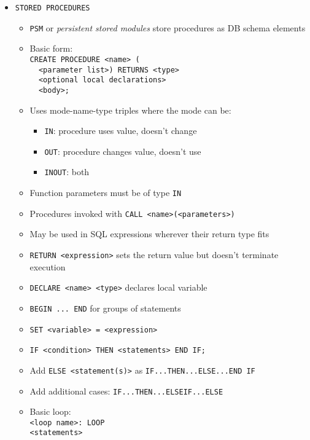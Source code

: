 \documentclass[landscape,8pt]{extarticle}
\newcommand{\code}{\lstinline}
\begin{document}
\begin{multicols}{4}
\begin{itemize}
\begin{itemize}
\begin{itemize}
        \end{itemize}
    \end{itemize}
    \item \code{STORED PROCEDURES}
    \begin{itemize}
        \item \code{PSM} or \emph{persistent stored modules} store procedures as DB schema elements
        \item Basic form:\\
\code{CREATE PROCEDURE <name> (}\\
\code{  <parameter list>) RETURNS <type>}\\
\code{  <optional local declarations>}\\
\code{  <body>;}
        \item Uses mode-name-type triples where the mode can be:
        \begin{itemize}
            \item \code{IN}: procedure uses value, doesn't change 
            \item \code{OUT}: procedure changes value, doesn't use
            \item \code{INOUT}: both
        \end{itemize}
        \item Function parameters must be of type \code{IN}
        \item Procedures invoked with \code{CALL <name>(<parameters>)}
        \item May be used in SQL expressions wherever their return type fits
        \item \code{RETURN <expression>} sets the return value but doesn't terminate execution
        \item \code{DECLARE <name> <type>} declares local variable
        \item \code{BEGIN ... END} for groups of statements
        \item \code{SET <variable> = <expression>}
        \item \code{IF <condition> THEN <statements> END IF;}
        \item Add \code{ELSE <statement(s)>} as \code{IF...THEN...ELSE...END IF}
        \item Add additional cases: \code{IF...THEN...ELSEIF...ELSE}
        \item Basic loop:\\
\code{<loop name>: LOOP}\\
\code{<statements>}\\

\end{itemize}
\end{itemize}
\end{multicols}
\end{document}
